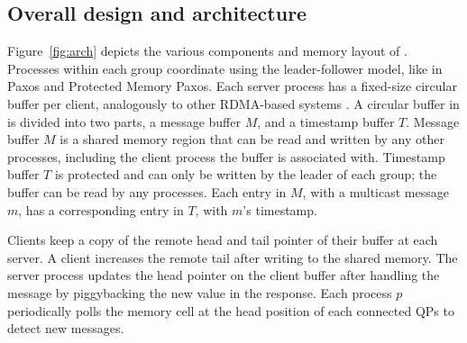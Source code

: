 \subsection{Overall design and architecture}

Figure~\ref{fig:arch} depicts the various components and memory layout of \libname.
Processes within each group coordinate using the leader-follower model, like in Paxos and Protected Memory Paxos.
Each server process has a fixed-size circular buffer per client, analogously to other RDMA-based systems \cite{FaRM, Mu, DARE, APUS}.
A circular buffer in \libname is divided into two parts, a message buffer $M$, and a timestamp buffer $T$.
Message buffer $M$ is a shared memory region that can be read and written by any other processes, including the client process the buffer is associated with.
Timestamp buffer $T$ is protected and can only be written by the leader of each group; the buffer can be read by any processes.
Each entry in $M$, with a multicast message $m$, has a corresponding entry in $T$, with $m$'s timestamp.


Clients keep a copy of the remote head and tail pointer of their buffer at each server. 
A client increases the remote tail after writing to the shared memory. 
The server process updates the head pointer on the client buffer after handling the message by piggybacking the new value in the response.
Each process $p$ periodically polls the memory cell at the head position of each
connected QPs to detect new messages.




